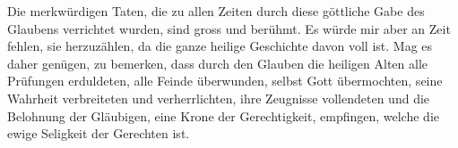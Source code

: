 \medskip

Die merkwürdigen Taten, die zu allen Zeiten durch diese göttliche Gabe des
Glaubens verrichtet wurden, sind gross und berühmt. Es würde mir aber an Zeit
fehlen, sie herzuzählen, da die ganze heilige Geschichte davon voll ist. Mag es
daher genügen, zu bemerken, dass durch den Glauben die heiligen Alten alle
Prüfungen erduldeten, alle Feinde überwunden, selbst Gott übermochten, seine
Wahrheit verbreiteten und verherrlichten, ihre
Zeugnisse vollendeten und die
Belohnung der Gläubigen, eine Krone der
Gerechtigkeit, empfingen, welche die
ewige Seligkeit der Gerechten ist.




